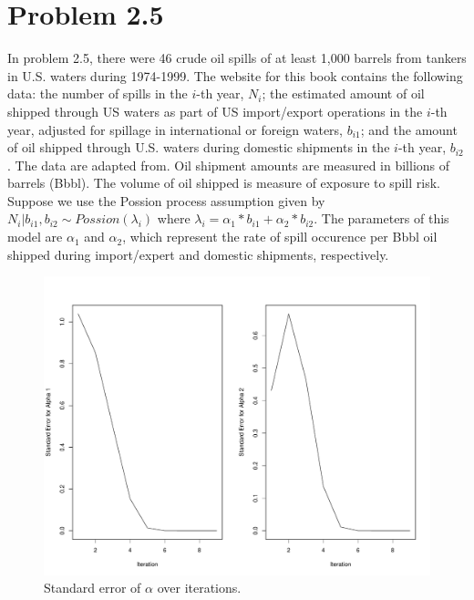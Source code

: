 \section{Problem 2.5}

In problem 2.5, there were 46 crude oil spills of at least 1,000 barrels from tankers in U.S. waters during 1974-1999. The website for this book contains the following data: the number of spills in the $i$-th year, $N_i$; the estimated amount of oil shipped through US waters as part of US import/export operations in the $i$-th year, adjusted for spillage in international or foreign waters, $b_{i1}$; and the amount of oil shipped through U.S. waters during domestic shipments in the $i$-th year, $b_{i2}$. The data are adapted from. Oil shipment amounts are measured in billions of barrels (Bbbl). The volume of oil shipped is measure of exposure to spill risk. Suppose we use the Possion process assumption given by $N_i | b_{i1}, b_{i2} \sim Possion(\lambda_i)$ where $\lambda_i = \alpha_1 * b_{i1} + \alpha_2 * b_{i2}$. The parameters of this model are $\alpha_1$ and $\alpha_2$, which represent the rate of spill occurence per Bbbl oil shipped during import/expert and domestic shipments, respectively. 

\begin{figure}[h!]
\includegraphics[scale=0.3]{figs/std-err-alpha.pdf}
\caption{Standard error of $\alpha$ over iterations.}
\label{img:std-err-alpha}
\end{figure}

